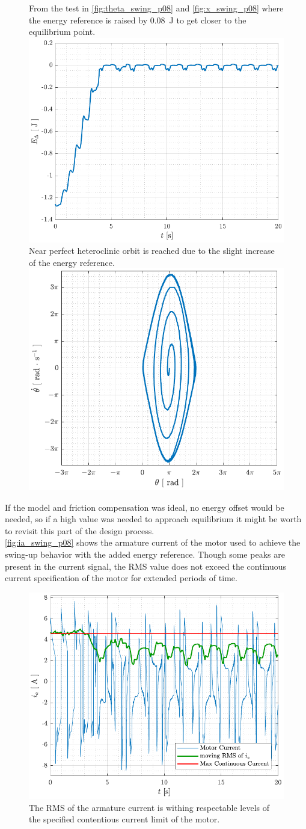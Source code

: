 \begin{figure}[H]
  \hspace{1cm}
  \captionbox
  {
    From the test in \autoref{fig:theta_swing_p08} and \ref{fig:x_swing_p08} where the energy reference is raised by \SI{0.08}{J} to get closer to the equilibrium point.
    \label{fig:Edelta_swing_p08}
  }
  {
    \hspace{-1cm}
    \includegraphics[width=.4\textwidth]{figures/Edelta_swing_p08}
  }
  \hspace{20pt}
  \captionbox 
  {
    Near perfect heteroclinic orbit is reached due to the slight increase of the energy reference.
    \label{fig:phase_swing_p08}
  }
  {
    \hspace{-1cm}
    \includegraphics[width=.364\textwidth]{figures/phase_swing_p08}
  }  
\end{figure}
If the model and friction compensation was ideal, no energy offset would be needed, so if a high value was needed to approach equilibrium it might be worth to revisit this part of the design process.\\
%
\autoref{fig:ia_swing_p08} shows the armature current of the motor used to achieve the swing-up behavior with the added energy reference. Though some peaks are present in the current signal, the RMS value does not exceed the continuous current specification of the motor for extended periods of time.
\begin{figure}[H]
  \includegraphics[width=.42\textwidth]{figures/ia_swing_p08}
  \caption{The RMS of the armature current is withing respectable levels of the specified contentious current limit of the motor.}
  \label{fig:ia_swing_p08}
\end{figure}
